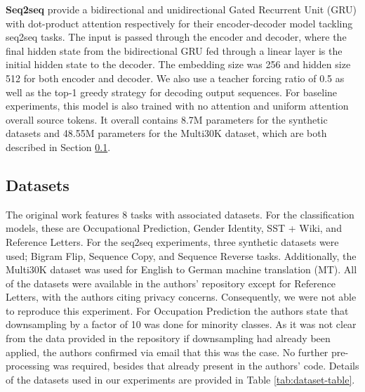 \textbf{Seq2seq} \cite{pruthi-etal-2020-learning} provide a bidirectional and unidirectional Gated Recurrent Unit (GRU) with dot-product attention respectively for their encoder-decoder model tackling seq2seq tasks. The input is passed through the encoder and decoder, where the final hidden state from the bidirectional GRU fed through a linear layer is the initial hidden state to the decoder. The embedding size was 256 and hidden size 512 for both encoder and decoder. We also use a teacher forcing ratio of 0.5 as well as the top-1 greedy strategy for decoding output sequences. For baseline experiments, this model is also trained with no attention and uniform attention overall source tokens. It overall contains 8.7M parameters for the synthetic datasets and 48.55M parameters for the Multi30K dataset, which are both described in Section \ref{sec:datasets}.

\subsection{Datasets}
\label{sec:datasets}

The original work features 8 tasks with associated datasets. For the classification models, these are Occupational Prediction, Gender Identity, SST + Wiki, and Reference Letters. For the seq2seq experiments, three synthetic datasets were used; Bigram Flip, Sequence Copy, and Sequence Reverse tasks. Additionally, the Multi30K dataset  was used for English to German machine translation (MT). All of the datasets were available in the authors' repository except for Reference Letters, with the authors citing privacy concerns. Consequently, we were not able to reproduce this experiment. For Occupation Prediction the authors state that downsampling by a factor of 10 was done for minority classes. As it was not clear from the data provided in the repository if downsampling had already been applied, the authors confirmed via email that this was the case. No further pre-processing was required, besides that already present in the authors' code. Details of the datasets used in our experiments are provided in Table \ref{tab:dataset-table}.

